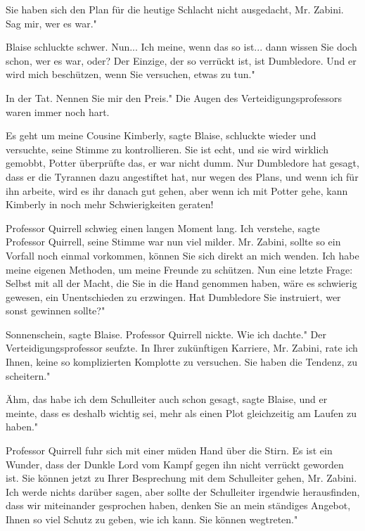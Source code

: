 \glqq Sie haben sich den Plan für die heutige Schlacht nicht ausgedacht, Mr.
Zabini. Sag mir, wer es war."

Blaise schluckte schwer. \glqq Nun... Ich meine, wenn das so ist... dann wissen
Sie doch schon, wer es war, oder? Der Einzige, der so verrückt ist, ist
Dumbledore. Und er wird mich beschützen, wenn Sie versuchen, etwas zu tun."

\glqq In der Tat. Nennen Sie mir den Preis." Die Augen des
Verteidigungsprofessors waren immer noch hart.

\glqq Es geht um meine Cousine Kimberly\grqq{}, sagte Blaise, schluckte wieder
und versuchte, seine Stimme zu kontrollieren. \glqq Sie ist echt, und sie wird
wirklich gemobbt\grqq{}, Potter überprüfte das, er war nicht dumm. Nur
Dumbledore hat gesagt, dass er die Tyrannen dazu angestiftet hat, nur wegen des
Plans, und wenn ich für ihn arbeite, wird es ihr danach gut gehen, aber wenn ich
mit Potter gehe, kann Kimberly in noch mehr Schwierigkeiten geraten!\grqq{}

Professor Quirrell schwieg einen langen Moment lang. \glqq Ich verstehe\grqq{},
sagte Professor Quirrell, seine Stimme war nun viel milder. \glqq Mr. Zabini,
sollte so ein Vorfall noch einmal vorkommen, können Sie sich direkt an mich
wenden. Ich habe meine eigenen Methoden, um meine Freunde zu schützen. Nun eine
letzte Frage: Selbst mit all der Macht, die Sie in die Hand genommen haben, wäre
es schwierig gewesen, ein Unentschieden zu erzwingen. Hat Dumbledore Sie
instruiert, wer sonst gewinnen sollte?"

\glqq Sonnenschein\grqq{}, sagte Blaise. Professor Quirrell nickte. \glqq Wie
ich dachte." Der Verteidigungsprofessor seufzte. \glqq In Ihrer zukünftigen
Karriere, Mr. Zabini, rate ich Ihnen, keine so komplizierten Komplotte zu
versuchen. Sie haben die Tendenz, zu scheitern."

\glqq Ähm, das habe ich dem Schulleiter auch schon gesagt\grqq{}, sagte Blaise,
\glqq und er meinte, dass es deshalb wichtig sei, mehr als einen Plot
gleichzeitig am Laufen zu haben."

Professor Quirrell fuhr sich mit einer müden Hand über die Stirn. \glqq Es ist
ein Wunder, dass der Dunkle Lord vom Kampf gegen ihn nicht verrückt geworden
ist. Sie können jetzt zu Ihrer Besprechung mit dem Schulleiter gehen, Mr.
Zabini. Ich werde nichts darüber sagen, aber sollte der Schulleiter irgendwie
herausfinden, dass wir miteinander gesprochen haben, denken Sie an mein
ständiges Angebot, Ihnen so viel Schutz zu geben, wie ich kann. Sie können
wegtreten."

